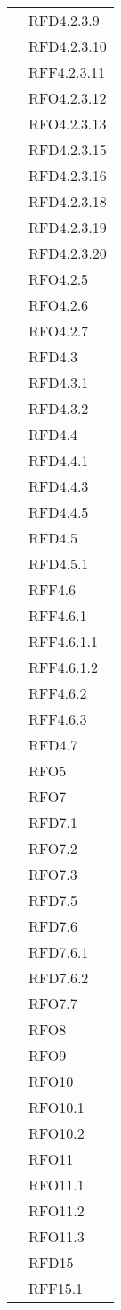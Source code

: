 \begin{longtable}{|>{\centering}m{10cm}|m{3cm}<{\centering}|}
& RFD4.2.3.9\\
& RFD4.2.3.10\\
& RFF4.2.3.11\\
& RFO4.2.3.12\\
& RFO4.2.3.13\\
& RFD4.2.3.15\\
& RFD4.2.3.16\\
& RFD4.2.3.18\\
& RFD4.2.3.19\\
& RFD4.2.3.20\\
& RFO4.2.5\\
& RFO4.2.6\\
& RFO4.2.7\\
& RFD4.3\\
& RFD4.3.1\\
& RFD4.3.2\\
& RFD4.4\\
& RFD4.4.1\\
& RFD4.4.3\\
& RFD4.4.5\\
& RFD4.5\\
& RFD4.5.1\\
& RFF4.6\\
& RFF4.6.1\\
& RFF4.6.1.1\\
& RFF4.6.1.2\\
& RFF4.6.2\\
& RFF4.6.3\\
& RFD4.7\\
& RFO5\\
& RFO7\\
& RFD7.1\\
& RFO7.2\\
& RFO7.3\\
& RFD7.5\\
& RFD7.6\\
& RFD7.6.1\\
& RFD7.6.2\\
& RFO7.7\\
& RFO8\\
& RFO9\\
& RFO10\\
& RFO10.1\\
& RFO10.2\\
& RFO11\\
& RFO11.1\\
& RFO11.2\\
& RFO11.3\\
& RFD15\\
& RFF15.1\\

\end{longtable}
